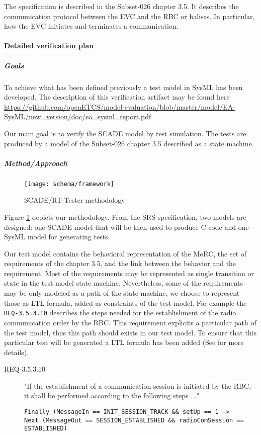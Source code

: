 The specification is described in the
Subset-026 chapter 3.5. It
describes the communication protocol between the EVC and the RBC or
balises. In particular, how the EVC initiates and terminates a
communication.



\paragraph{Detailed verification plan}

\subparagraph{Goals}

To achieve what has been defined previously a test model in SysML has
been developed. The description of this verification artifact may be
found here \url{https://github.com/openETCS/model-evaluation/blob/master/model/EA-SysML/new_version/doc/ea_sysml_report.pdf}

Our main goal is to verify the SCADE model by test simulation. The
tests are produced by a model of the Subset-026 chapter 3.5 described as a
state machine.

\subparagraph{Method/Approach}

\begin{figure}
\texttt{[image: schema/framework]}
\caption{\label{fig:method}SCADE/RT-Tester methodology}
\end{figure}

Figure \ref{fig:method} depicts our methodology. From the SRS
specification, two models are designed: one SCADE model that will
be then  used to produce C code and one SysML model for generating
tests.

Our test model contains the behavioral representation of the MoRC, the
set of requirements of the chapter 3.5, and the link between the behavior
and the requirement.  Most of the requirements may be represented as
single transition or state in the test model state
machine. Nevertheless, some of the requirements may be only modeled as
a path of the state machine, we choose to represent those as LTL
formula, added as constraints of the test model. For example the
\verb+REQ-3.5.3.10+ describes the steps needed for the establishment of
the radio communication order by the RBC. This requirement explicits a
particular path of the test model, thus this path should exists in our
test model. To ensure that this particular test will be generated a LTL
formula has been added (See \cite{braunstein_MorC_2013} for more
details).

\begin{description}
\item[REQ-3.5.3.10] "If the establishment of a communication session is
initiated by the RBC, it shall be performed according to the following steps
..."
\vspace{-1em}
\begin{verbatim}
Finally (MessageIn == INIT_SESSION_TRACK && setUp == 1 -> 
Next (MessageOut == SESSION_ESTABLISHED && radioComSession == ESTABLISHED)
\end{verbatim}
\end{description}

